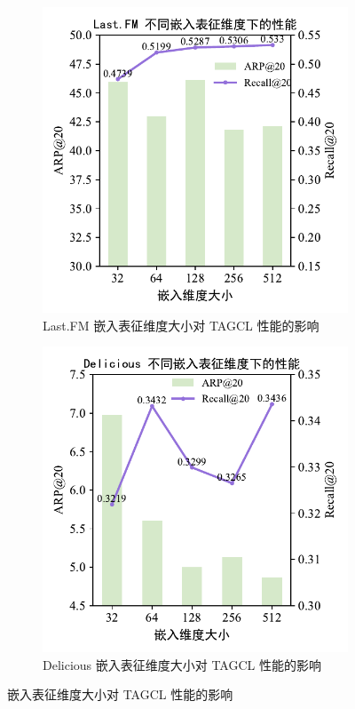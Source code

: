\begin{figure}[!h]
  \centering
  \begin{subfigure}{0.49\linewidth}
    \centering
    \includegraphics[width=.88\linewidth]{figure/tagcl_param_lastfm_emb.pdf}
    \caption{Last.FM 嵌入表征维度大小对 TAGCL 性能的影响}
    \label{fig:tagcl_param_lastfm_emb}
  \end{subfigure} 
  \begin{subfigure}{0.49\linewidth}
      \centering
      \includegraphics[width=.88\linewidth]{figure/tagcl_param_de_emb.pdf}
      \caption{Delicious 嵌入表征维度大小对 TAGCL 性能的影响}
      \label{fig:tagcl_param_de_emb}
  \end{subfigure}
  \caption{嵌入表征维度大小对 TAGCL 性能的影响}
  \label{fig:tagcl_param_emb}
\end{figure}


